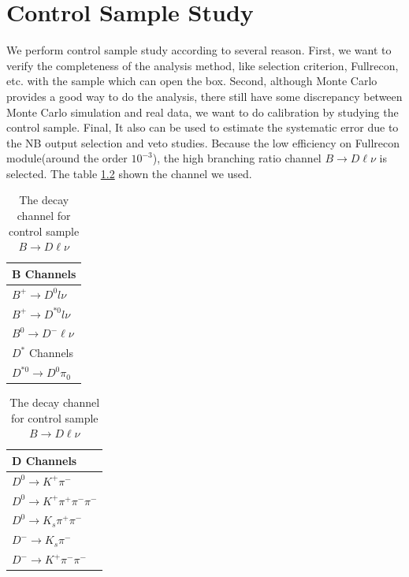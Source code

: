 \chapter{Control Sample Study}
We perform control sample study according to several reason. First, we want to verify the completeness of the analysis method, like selection criterion, Fullrecon, etc. with the sample which can open the box. Second, although Monte Carlo provides a good way to do the analysis, there still have some discrepancy between Monte Carlo simulation and real data, we want to do calibration by studying the control sample. Final, It also can be used to estimate the systematic error due to the NB output selection and veto studies. Because the low efficiency on Fullrecon module(around the order $10^{-3}$), the high branching ratio channel $B \rightarrow D \ell \nu$ is selected. The table \ref{t:controlsamplemode} shown the channel we used.
\begin{table}[ht]
\small
\begin{minipage}[b]{80mm}
\begin{center}

\begin{tabular}{ |p{5cm}| }
\hline
 B Channels \\
 \hline
 \hline
  $B^+ \rightarrow D^{0} l \nu $    \\
 \hline
  $B^+ \rightarrow D^{*0} l \nu $    \\
 \hline
  $B^0 \rightarrow D^- \ell \nu   $  \\ 
 \hline
 \hline
  $D^*$ Channels \\
 \hline
 \hline
  $D^{*0} \rightarrow D^0 \pi_0  $    \\

   \hline
 \hline

\end{tabular}
\end{center}

\end{minipage}
\begin{minipage}[b]{80mm}
\begin{center}

\begin{tabular}{ |p{5cm}| }
  \hline
 D Channels \\
 \hline
 \hline
  $D^0 \rightarrow K^+ \pi ^-$    \\
 \hline
   $D^0 \rightarrow K^+ \pi ^+  \pi ^-  \pi ^-$    \\
 \hline
   $D^0 \rightarrow K_s \pi ^+  \pi ^-$   \\
   \hline
\hline
 $D^- \rightarrow K_s \pi^-$   \\ 
 \hline
  $D^- \rightarrow K^+ \pi ^- \pi^-$\\
     \hline
\hline
 \end{tabular}
 \end{center}
\end{minipage}

\caption{The decay channel for control sample $B \rightarrow D \ell \nu$} \label{t:controlsamplemode}
\end{table}
